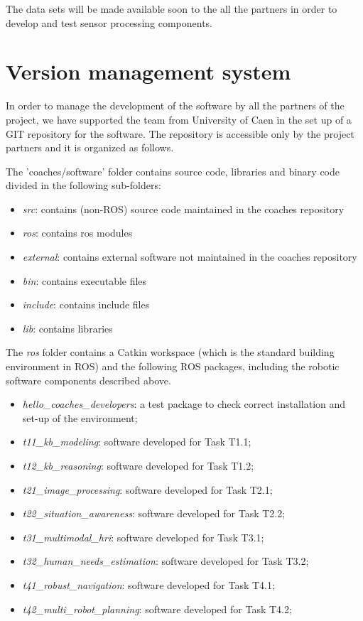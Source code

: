 \documentclass{article}
\begin{document}
The data sets will be made available soon to the all the partners in order to develop and test sensor processing components.

\section{Version management system}

In order to manage the development of the software by all the partners of the project, we have supported the team from University of Caen in the set up of a GIT repository for the software.
The repository is accessible only by the project partners and it is organized as follows.

The 'coaches/software' folder contains source code, libraries and binary code 
divided in the following sub-folders:

\begin{itemize}
\item \emph{src}:       contains (non-ROS) source code maintained in the coaches repository
\item \emph{ros}:       contains ros modules
\item \emph{external}:  contains external software not maintained in the coaches repository
\item \emph{bin}:       contains executable files
\item \emph{include}:   contains include files 
\item \emph{lib}:       contains libraries
\end{itemize}


The \emph{ros} folder contains a Catkin workspace (which is the standard building environment in ROS) and the following ROS packages, including the robotic software components described above.

\begin{itemize}
\item \emph{hello\_coaches\_developers}: a test package to check correct installation and set-up of the environment;
\item \emph{t11\_kb\_modeling}: software developed for Task T1.1;
\item \emph{t12\_kb\_reasoning}: software developed for Task T1.2;
\item \emph{t21\_image\_processing}: software developed for Task T2.1;
\item \emph{t22\_situation\_awareness}: software developed for Task T2.2;
\item \emph{t31\_multimodal\_hri}: software developed for Task T3.1;
\item \emph{t32\_human\_needs\_estimation}: software developed for Task T3.2;
\item \emph{t41\_robust\_navigation}: software developed for Task T4.1;
\item \emph{t42\_multi\_robot\_planning}: software developed for Task T4.2;
\end{itemize}
\end{document}
